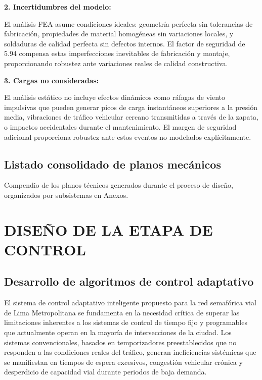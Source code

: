\documentclass[12pt,a4paper,oneside]{report}
\begin{document}
\textbf{2. Incertidumbres del modelo:}

El análisis FEA asume condiciones ideales: geometría perfecta sin tolerancias de fabricación, propiedades de material homogéneas sin variaciones locales, y soldaduras de calidad perfecta sin defectos internos. El factor de seguridad de 5.94 compensa estas imperfecciones inevitables de fabricación y montaje, proporcionando robustez ante variaciones reales de calidad constructiva.

\textbf{3. Cargas no consideradas:}

El análisis estático no incluye efectos dinámicos como ráfagas de viento impulsivas que pueden generar picos de carga instantáneos superiores a la presión media, vibraciones de tráfico vehicular cercano transmitidas a través de la zapata, o impactos accidentales durante el mantenimiento. El margen de seguridad adicional proporciona robustez ante estos eventos no modelados explícitamente.

\section{Listado consolidado de planos mecánicos}\label{listado-consolidado-de-planos-mecuxe1nicos}

Compendio de los planos técnicos generados durante el proceso de diseño, organizados por subsistemas en Anexos.

\chapter{DISEÑO DE LA ETAPA DE CONTROL}\label{capuxedtulo-6-diseuxf1o-de-la-etapa-de-control}

\section{Desarrollo de algoritmos de control adaptativo}\label{desarrollo-de-algoritmos-de-control-adaptativo}

El sistema de control adaptativo inteligente propuesto para la red semafórica vial de Lima Metropolitana se fundamenta en la necesidad crítica de superar las limitaciones inherentes a los sistemas de control de tiempo fijo y programables que actualmente operan en la mayoría de intersecciones de la ciudad. Los sistemas convencionales, basados en temporizadores preestablecidos que no responden a las condiciones reales del tráfico, generan ineficiencias sistémicas que se manifiestan en tiempos de espera excesivos, congestión vehicular crónica y desperdicio de capacidad vial durante periodos de baja demanda.
\end{document}
